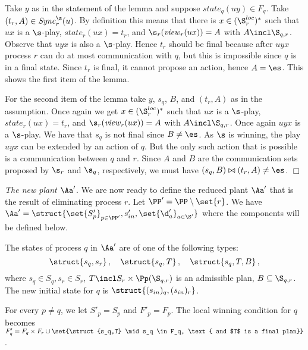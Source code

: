 \documentclass{llncs}
\newcommand{\Sync}{\mathit{Sync}}
\newcommand{\state}{\mathit{state}}
\newcommand{\view}{\mathit{view}}
\renewenvironment{proof}{{\em Proof. }}{\nopagebreak
  \hspace*{\fill}$\Box$}
\begin{document}
\begin{proof}
  Take $y$ as in the statement of the lemma and suppose $\state_q(uy)
  \in F_q$. Take $(t_r,A)\in \Sync^\s_r(u)$. By definition this means
  that there is $x\in (\S^{loc}_r)^*$ such that $ux$ is a $\s$-play,
  $\state_r(ux)=t_r$, and $\s_r(\view_r(ux))=A$ with $A\incl
  \S_{q,r}$. Observe that $uyx$ is also a $\s$-play. Hence $t_r$ should
  be final because after $uyx$ process $r$ can do at most
  communication with $q$, but this is impossible since $q$ is in a
  final state. Since $t_r$ is final, it cannot propose an action,
  hence $A=\es$. This shows the first item of the lemma.

  For the second item of the lemma take $y$, $s_q$, $B$, and $(t_r,A)$ as in
  the assumption. Once again we get $x\in (\S^{loc}_r)^*$ such that
  $ux$ is a $\s$-play, $\state_r(ux)=t_r$, and $\s_r(\view_r(ux))=A$
  with $A\incl \S_{q,r}$. Once again $uyx$ is a $\s$-play. We have
  that $s_q$ is not final since $B\not=\es$. As
  $\s$ is winning, the play $uyx$ can be extended by an action of
  $q$. But the only such action that is possible is a communication
  between $q$ and $r$. Since $A$ and $B$ are the communication sets
  proposed by $\s_r$ and $\s_q$, respectively, we must
  have $(s_q,B) \bowtie (t_r,A) \not=\es$.
\end{proof}


\medskip
\textit{The new plant $\Aa'$}.  We are now ready to define the reduced
plant $\Aa'$ that is the result of eliminating process $r$.  Let
$\PP'=\PP\setminus \set{r}$.  We have $\Aa'=\struct{\set{S'_p}_{p\in
    \PP'},s'_{in},\set{\d'_a}_{a\in\S'}}$ where the components will be
defined below.

The states of process $q$ in $\Aa'$ are of one of the following types:
\begin{equation*}
\struct{s_q,s_r}\,,\quad \struct{s_q,T}\,,\quad  \struct{s_q,T,B}  \,,
\end{equation*}
where $s_q \in S_q, s_r\in S_r$, $T \incl S_r\times\Pp(\S_{q,r})$ is
an admissible plan, $B\subseteq \S_{q,r}$. The new initial state for $q$ is
$\struct{(s_{in})_q,(s_{in})_r}$.


For every $p \not= q$, we let $S'_p=S_p$ and $F'_p =F_p$. The local
winning condition for $q$ becomes 
$F'_q = F_q \times F_r \cup
\set{\struct{s_q,T} \mid s_q \in F_q, \text{ and $T$  is a final plan}}$.
\end{document}
